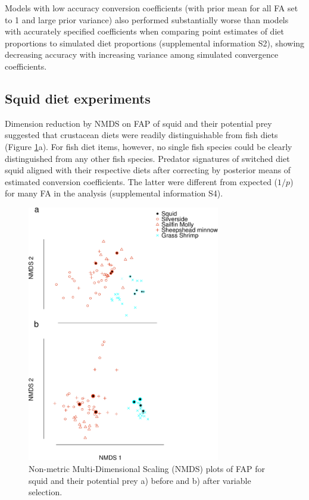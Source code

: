 \documentclass[fleqn,10pt]{wlpeerj}
\begin{document}
Models with low accuracy conversion coefficients (with prior mean for
all FA set to 1 and large prior variance) also performed substantially
worse than models with accurately specified coefficients when
comparing point estimates of diet proportions to simulated diet
proportions (supplemental information S2), showing decreasing accuracy with increasing variance among simulated convergence coefficients.

\subsection*{Squid diet experiments}

Dimension reduction by NMDS on FAP of squid and their potential prey suggested that crustacean diets were
readily distinguishable from fish diets
(Figure \ref{fig:squid_FAP}a). For fish diet items, however, no single
fish species could be clearly distinguished from any other fish species. Predator signatures of switched diet squid aligned with their
respective diets after correcting by posterior means of estimated conversion
coefficients. The latter were different from expected ($1/p$) for many
FA in the analysis (supplemental information S4).


\begin{figure}
  \begin{center}
      \includegraphics[width=0.75\textwidth]{figures/2nd_NMDS_pre.pdf}
    \caption{Non-metric Multi-Dimensional Scaling (NMDS) plots of FAP
      for 
      squid and their potential prey a) before and b) after variable selection.}
    \label{fig:squid_FAP}
  \end{center}
\end{figure}
\end{document}

